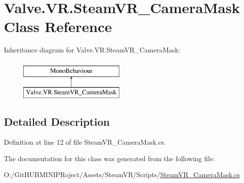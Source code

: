 \hypertarget{class_valve_1_1_v_r_1_1_steam_v_r___camera_mask}{}\section{Valve.\+V\+R.\+Steam\+V\+R\+\_\+\+Camera\+Mask Class Reference}
\label{class_valve_1_1_v_r_1_1_steam_v_r___camera_mask}
Inheritance diagram for Valve.\+V\+R.\+Steam\+V\+R\+\_\+\+Camera\+Mask\+:\begin{figure}[H]
\begin{center}
\leavevmode
\includegraphics[height=2.000000cm]{class_valve_1_1_v_r_1_1_steam_v_r___camera_mask}
\end{center}
\end{figure}


\subsection{Detailed Description}


Definition at line 12 of file Steam\+V\+R\+\_\+\+Camera\+Mask.\+cs.



The documentation for this class was generated from the following file\+:\begin{DoxyCompactItemize}
\item 
O\+:/\+Git\+H\+U\+B\+M\+I\+N\+I\+P\+Roject/\+Assets/\+Steam\+V\+R/\+Scripts/\mbox{\hyperlink{_steam_v_r___camera_mask_8cs}{Steam\+V\+R\+\_\+\+Camera\+Mask.\+cs}}\end{DoxyCompactItemize}
